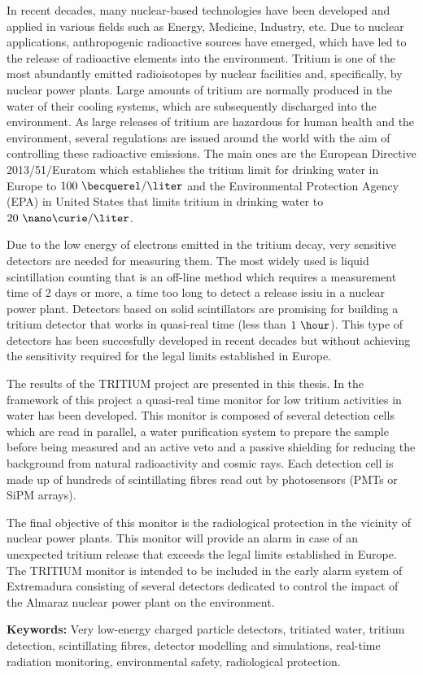 In recent decades, many nuclear-based technologies have been developed and applied in various fields such as Energy, Medicine, Industry, etc. Due to nuclear applications, anthropogenic radioactive sources have emerged, which have led to the release of radioactive elements into the environment. Tritium is one of the most abundantly emitted radioisotopes by nuclear facilities and, specifically, by nuclear power plants. Large amounts of tritium are normally produced in the water of their cooling systems, which are subsequently discharged into the environment. As large releases of tritium are hazardous for human health and the environment, several regulations are issued around the world with the aim of controlling these radioactive emissions. The main ones are the European Directive 2013/51/Euratom which establishes the tritium limit for drinking water in Europe to $100~\becquerel/\liter$ and the Environmental Protection Agency (EPA) in United States that limits tritium in drinking water to $20~\nano\curie/\liter$.

Due to the low energy of electrons emitted in the tritium decay, very sensitive detectors are needed for measuring them. The most widely used is liquid scintillation counting that is an off-line method which requires a measurement time of 2 days or more, a time too long to detect a release issiu in a nuclear power plant. Detectors based on solid scintillators are promising for building a tritium detector that works in quasi-real time (less than $1~\hour$). This type of detectors has been succesfully developed in recent decades but without achieving the sensitivity required for the legal limits established in Europe.

The results of the TRITIUM project are presented in this thesis. In the framework of this project a quasi-real time monitor for low tritium activities in water has been developed. This monitor is composed of several detection cells which are read in parallel, a water purification system to prepare the sample before being measured and an active veto and a passive shielding for reducing the background from natural radioactivity and cosmic rays. Each detection cell is made up of hundreds of scintillating fibres read out by photosensors (PMTs or SiPM arrays).

The final objective of this monitor is the radiological protection in the vicinity of nuclear power plants. This monitor will provide an alarm in case of an unexpected tritium release that exceeds the legal limits established in Europe. The TRITIUM monitor is intended to be included in the early alarm system of Extremadura consisting of several detectors dedicated to control the impact of the Almaraz nuclear power plant on the environment.

\vspace{1cm}

\textbf{Keywords:} Very low-energy charged particle detectors, tritiated water, tritium detection, scintillating fibres, detector modelling and simulations, real-time radiation monitoring, environmental safety, radiological protection.